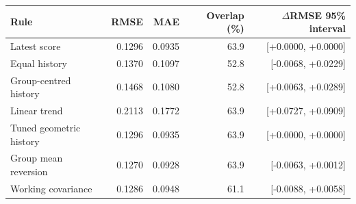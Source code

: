 \begin{tabular}{lrrrr}
\toprule
Rule & RMSE & MAE & Overlap (\%) & $\Delta$RMSE 95\% interval \\
\midrule
Latest score & 0.1296 & 0.0935 & 63.9 & [+0.0000, +0.0000] \\
Equal history & 0.1370 & 0.1097 & 52.8 & [-0.0068, +0.0229] \\
Group-centred history & 0.1468 & 0.1080 & 52.8 & [+0.0063, +0.0289] \\
Linear trend & 0.2113 & 0.1772 & 63.9 & [+0.0727, +0.0909] \\
Tuned geometric history & 0.1296 & 0.0935 & 63.9 & [+0.0000, +0.0000] \\
Group mean reversion & 0.1270 & 0.0928 & 63.9 & [-0.0063, +0.0012] \\
Working covariance & 0.1286 & 0.0948 & 61.1 & [-0.0088, +0.0058] \\
\bottomrule
\end{tabular}
